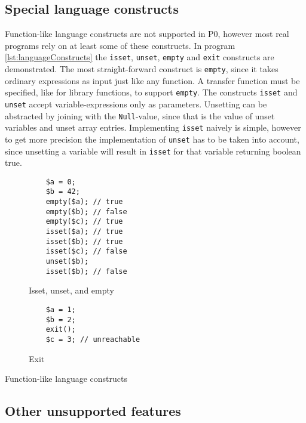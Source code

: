 \subsection{Special language constructs}
Function-like language constructs are not supported in P0, however most real programs rely on at least some of these constructs. In program \ref{lst:languageConstructs} the \texttt{isset}, \texttt{unset}, \texttt{empty} and \texttt{exit} constructs are demonstrated. The most straight-forward construct is \texttt{empty}, since it takes ordinary expressions as input just like any function. A transfer function must be specified, like for library functions, to support \texttt{empty}. The constructs \texttt{isset} and \texttt{unset} accept variable-expressions only as parameters. Unsetting can be abstracted by joining with the \texttt{Null}-value, since that is the value of unset variables and unset array entries. Implementing \texttt{isset} naively is simple, however to get more precision the implementation of \texttt{unset} has to be taken into account, since unsetting a variable will result in \texttt{isset} for that variable returning boolean true. 

\begin{program}
\begin{subfigure}[b]{.45\linewidth}
    \begin{lstlisting}
    $a = 0;
    $b = 42;
    empty($a); // true
    empty($b); // false
    empty($c); // true
    isset($a); // true
    isset($b); // true
    isset($c); // false
    unset($b);
    isset($b); // false
\end{lstlisting}
    \caption{Isset, unset, and empty}
\end{subfigure}
\begin{subfigure}[b]{.50\linewidth}
    \begin{lstlisting}
    $a = 1;
    $b = 2;
    exit();
    $c = 3; // unreachable
\end{lstlisting}
    \caption{Exit}
\end{subfigure}
\caption{Function-like language constructs}
\label{lst:languageConstructs}
\end{program}

\subsection{Other unsupported features}


